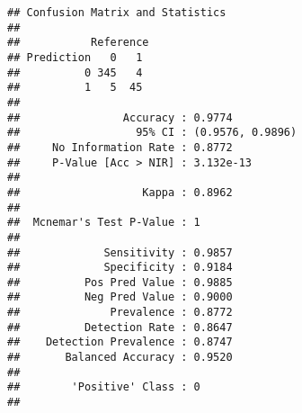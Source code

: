 \documentclass[
]{article}
\begin{document}
\begin{verbatim}
## Confusion Matrix and Statistics
## 
##           Reference
## Prediction   0   1
##          0 345   4
##          1   5  45
##                                           
##                Accuracy : 0.9774          
##                  95% CI : (0.9576, 0.9896)
##     No Information Rate : 0.8772          
##     P-Value [Acc > NIR] : 3.132e-13       
##                                           
##                   Kappa : 0.8962          
##                                           
##  Mcnemar's Test P-Value : 1               
##                                           
##             Sensitivity : 0.9857          
##             Specificity : 0.9184          
##          Pos Pred Value : 0.9885          
##          Neg Pred Value : 0.9000          
##              Prevalence : 0.8772          
##          Detection Rate : 0.8647          
##    Detection Prevalence : 0.8747          
##       Balanced Accuracy : 0.9520          
##                                           
##        'Positive' Class : 0               
## 
\end{verbatim}
\end{document}
